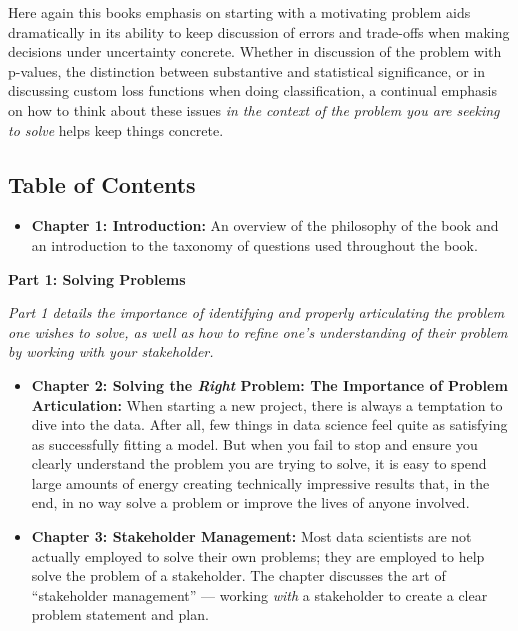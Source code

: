 \documentclass[12pt]{article}
\begin{document}
Here again this books emphasis on starting with a motivating problem
aids dramatically in its ability to keep discussion of errors and
trade-offs when making decisions under uncertainty concrete. Whether in
discussion of the problem with p-values, the distinction between
substantive and statistical significance, or in discussing custom loss
functions when doing classification, a continual emphasis on how to
think about these issues \emph{in the context of the problem you are
seeking to solve} helps keep things concrete.

\subsection*{Table of Contents}\label{table-of-contents}

\begin{itemize}

\item
  \textbf{Chapter 1: Introduction:} An overview of the philosophy of the
  book and an introduction to the taxonomy of questions used throughout
  the book.
\end{itemize}

\textbf{Part 1: Solving Problems}

\emph{Part 1 details the importance of identifying and properly
articulating the problem one wishes to solve, as well as how to refine
one's understanding of their problem by working with your stakeholder.}

\begin{itemize}

\item
  \textbf{Chapter 2: Solving the \emph{Right} Problem: The Importance of
  Problem Articulation:} When starting a new project, there is always a
  temptation to dive into the data. After all, few things in data
  science feel quite as satisfying as successfully fitting a model. But
  when you fail to stop and ensure you clearly understand the problem
  you are trying to solve, it is easy to spend large amounts of energy
  creating technically impressive results that, in the end, in no way
  solve a problem or improve the lives of anyone involved.
\item
  \textbf{Chapter 3: Stakeholder Management:} Most data scientists are
  not actually employed to solve their own problems; they are employed
  to help solve the problem of a stakeholder. The chapter discusses the
  art of ``stakeholder management'' --- working \emph{with} a
  stakeholder to create a clear problem statement and plan.
\end{itemize}
\end{document}
